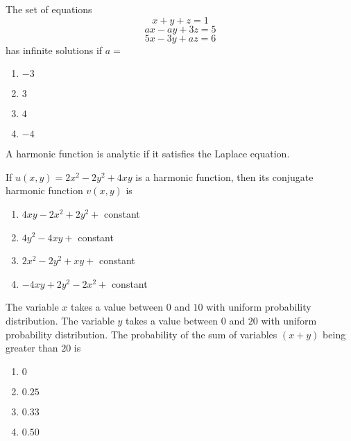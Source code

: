     \item The set of equations
        $$x+y+z=1$$
        $$ax-ay+3z=5$$
        $$5x-3y+az=6$$
        has infinite solutions if $a=$
        \begin{enumerate}
            \item $-3$
            \item $3$
            \item $4$
            \item $-4$
        \end{enumerate}

    \item A harmonic function is analytic if it satisfies the Laplace equation.

        If $u(x,y)=2x^2-2y^2+4xy$ is a harmonic function, then its conjugate harmonic function $v(x,y)$ is
        \begin{enumerate}
            \item $4xy-2x^2+2y^2+$ constant
            \item $4y^2-4xy+$ constant
            \item $2x^2-2y^2+xy+$ constant
            \item $-4xy+2y^2-2x^2+$ constant
        \end{enumerate}

    \item The variable $x$ takes a value between $0$ and $10$ with uniform probability distribution. The variable $y$ takes a value between $0$ and $20$ with uniform probability distribution. The probability of the sum of variables $(x + y)$ being greater than $20$ is
        \begin{enumerate}
            \item $0$
            \item $0.25$
            \item $0.33$
            \item $0.50$
        \end{enumerate}

